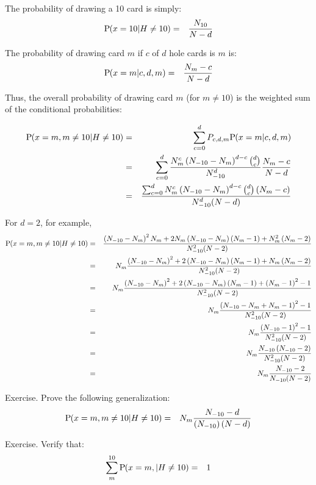 \noindent
The probability of drawing a 10 card is simply:
\begin{eqnarray}
\textrm{P}\hspace{-.5ex}\left(x=10|H\neq{}10\right) &=& \frac{N_{10}}{N-d}
\end{eqnarray}

\noindent
The probability of drawing card $m$ if $c$ of $d$ hole cards is $m$ is:
\begin{eqnarray}
\textrm{P}\hspace{-.5ex}\left(x=m|c,d,m\right) &=& \frac{N_m-c}{N-d}
\end{eqnarray}

\noindent
Thus, the overall probability of drawing card $m$ (for $m\neq{}10$) 
is the weighted sum of the conditional probabilities:

\begin{eqnarray}
\Prob{x=m,m\neq{}10|H\neq{}10} &=&
  \Sum{c=0}{d}{P_{c,d,m}\Prob{x=m|c,d,m}} \\
&=& \Sum{c=0}{d}{%
\frac{N_m^c\Paren{N_{-10}-N_m}^{d-c}\nCr{d}{c}}{N_{-10}^d}%
\frac{N_m-c}{N-d}} \\
&=& \frac{\Sum{c=0}{d}{N_m^c\Paren{N_{-10}-N_m}^{d-c}\nCr{d}{c}\Paren{N_m-c}}}
{N_{-10}^d{\Paren{N-d}}}
\end{eqnarray}

For $d=2$, for example, 
\begin{eqnarray}
\textrm{P}\hspace{-.5ex}\left(x=m,m\neq{}10|H\neq{}10\right)
&=& \frac{\left(N_{-10}-N_m\right)^2 N_m
 +2 N_m\left(N_{-10}-N_m\right)\left(N_m-1\right)
 +N_m^2\left(N_m-2\right)
}{N_{-10}^2{\left(N-2\right)}} \\
&=& N_m \frac{\left(N_{-10}-N_m\right)^2
 + 2\left(N_{-10}-N_m\right)\left(N_m-1\right)
 +N_m\left(N_m-2\right)
}{N_{-10}^2{\left(N-2\right)}} \\
&=& N_m \frac{\left(N_{-10}-N_m\right)^2
 + 2\left(N_{-10}-N_m\right)\left(N_m-1\right)
 +\left(N_m-1\right)^2 -1
}{N_{-10}^2{\left(N-2\right)}} \\
&=& N_m \frac{\left(N_{-10}-N_m +N_m -1\right)^2 -1
}{N_{-10}^2{\left(N-2\right)}} \\
&=& N_m \frac{\left(N_{-10} -1\right)^2 -1
}{N_{-10}^2{\left(N-2\right)}} \\
&=& N_m \frac{N_{-10}\left(N_{-10} -2\right)
}{N_{-10}^2{\left(N-2\right)}} \\
&=& N_m \frac{N_{-10} -2}{N_{-10}{\left(N-2\right)}}
\end{eqnarray}

Exercise.
Prove the following generalization:
\begin{eqnarray}
\textrm{P}\hspace{-.5ex}\left(x=m,m\neq{}10|H\neq{}10\right) &=&
  N_m \frac{N_{-10} -d}{\left(N_{-10}\right){\left(N-d\right)}}
\end{eqnarray}

Exercise.
Verify that:
\begin{eqnarray}
\sum_{m}^{10}{\textrm{P}\hspace{-.5ex}\left(x=m,|H\neq{}10\right)} &=& 1
\end{eqnarray}

